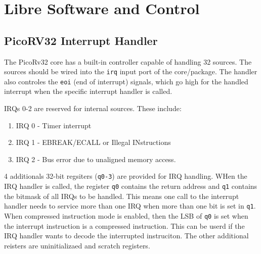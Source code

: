 \chapter{Libre Software and Control} 

\section{PicoRV32 Interrupt Handler}

The PicoRv32 core has a built-in controller capable of handling 32 sources. The sources should be wired into the \texttt{irq} input port of the core/package. The handler also controles the \texttt{eoi} (end of interrupt) signals, which go high for the handled interrupt when the specific interrupt handler is called. 

IRQs 0-2 are reserved for internal sources. These include: \begin{enumerate}
      \item IRQ 0 - Timer interrupt
      \item IRQ 1 - EBREAK/ECALL or Illegal INstructions
      \item IRQ 2 - Bus error due to unaligned memory access.  
\end{enumerate}

4 additionals 32-bit regsiters (\texttt{q0-3}) are provided for IRQ handling. WHen the IRQ handler is called, the register \texttt{q0} contains the return address and \texttt{q1} contains the bitmask of all IRQs to be handled. This means one call to the interrupt handler needs to service more than one IRQ when more than one bit is set in \texttt{q1}. When compressed instruction mode is enabled, then the LSB of \texttt{q0} is set when the interrupt instruction is a compressed instruction. This can be userd if the IRQ handler wants to decode the interrupted instruciton. The other additional reisters are uninitializaed and scratch registers. 


